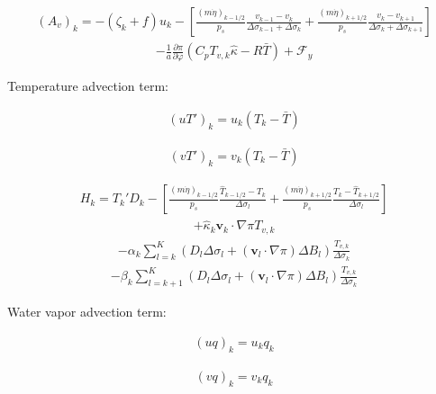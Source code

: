 \begin{eqnarray}
  (A_v)_k
    =  - ( \zeta_k + f ) u_k
             - \left[ \frac{(m\dot{\eta})_{k-1/2}}{p_s} \frac{v_{k-1} - v_k}{\Delta\sigma_{k-1}+\Delta\sigma_k}
               + \frac{(m\dot{\eta})_{k+1/2}}{p_s} \frac{v_k   - v_{k+1}}{\Delta\sigma_{k}+\Delta\sigma_{k+1}} \right]
\end{eqnarray} \begin{eqnarray}
           - \frac{1}{a} \frac{\partial \pi}{\partial \varphi}(C_p T_{v,k}\hat{\kappa}-R\bar{T})
             + {\mathcal F}_y
\end{eqnarray}

Temperature advection term:

\begin{eqnarray}
 (u T')_k  = u_k (T_k - \bar{T} )
\end{eqnarray}

\begin{eqnarray}
 (v T')_k  = v_k (T_k - \bar{T} )
\end{eqnarray}

\begin{eqnarray}
   H_k =  T_k' D_k
          - \left[ \frac{(m\dot{\eta})_{k-1/2}}{p_s} \frac{\hat{T}_{k-1/2} - T_k}{\Delta \sigma_l}
               + \frac{(m\dot{\eta})_{k+1/2}}{p_s} \frac{T_k - \hat{T}_{k+1/2}}{\Delta \sigma_l} \right]
\end{eqnarray} \begin{eqnarray}
        + \hat{\kappa}_k {\mathbf{v}}_k \cdot \nabla \pi T_{v,k}
\end{eqnarray} \begin{eqnarray}
        - \alpha_k \sum_{l=k}^{K}
                           (D_l \Delta \sigma_l + ({\mathbf{v}}_l \cdot \nabla \pi)\Delta B_l)
                            \frac{T_{v,k}}{\Delta \sigma_k}
\end{eqnarray} \begin{eqnarray}
        - \beta_k \sum_{l=k+1}^{K}
                           (D_l \Delta \sigma_l + ({\mathbf{v}}_l \cdot \nabla \pi)\Delta B_l)
                            \frac{T_{v,k}}{\Delta \sigma_k}
\end{eqnarray}

Water vapor advection term:

\begin{eqnarray}
 (u q)_k  = u_k q_k
\end{eqnarray}

\begin{eqnarray}
 (v q)_k  = v_k q_k
\end{eqnarray}

